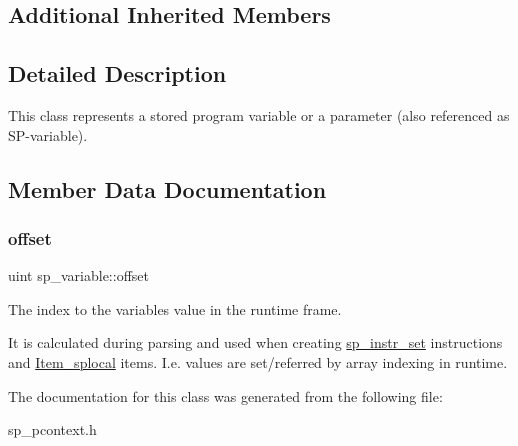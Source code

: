 \subsection*{Additional Inherited Members}


\subsection{Detailed Description}
This class represents a stored program variable or a parameter (also referenced as \textquotesingle{}SP-\/variable\textquotesingle{}). 

\subsection{Member Data Documentation}
\mbox{\label{classsp__variable_ab053166f9aaf72e5bfb2eb5df27672df}} 
\subsubsection{\texorpdfstring{offset}{offset}}
{\footnotesize\ttfamily uint sp\+\_\+variable\+::offset}

The index to the variable\textquotesingle{}s value in the runtime frame.

It is calculated during parsing and used when creating \mbox{\hyperlink{classsp__instr__set}{sp\+\_\+instr\+\_\+set}} instructions and \mbox{\hyperlink{classItem__splocal}{Item\+\_\+splocal}} items. I.\+e. values are set/referred by array indexing in runtime. 

The documentation for this class was generated from the following file\+:\begin{DoxyCompactItemize}
\item 
sp\+\_\+pcontext.\+h\end{DoxyCompactItemize}
